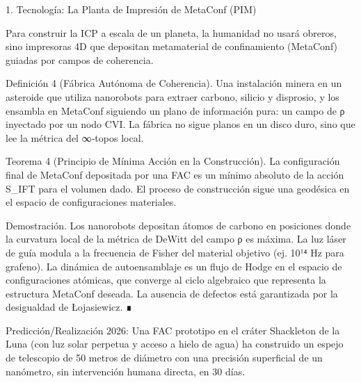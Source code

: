 \documentclass[12pt,a4paper]{book}
\begin{document}
1. Tecnología: La Planta de Impresión de MetaConf (PIM)

Para construir la ICP a escala de un planeta, la humanidad no usará obreros, sino impresoras 4D que depositan metamaterial de confinamiento (MetaConf) guiadas por campos de coherencia.

Definición 4 (Fábrica Autónoma de Coherencia). Una instalación minera en un asteroide que utiliza nanorobots para extraer carbono, silicio y disprosio, y los ensambla en MetaConf siguiendo un plano de información pura: un campo de ρ inyectado por un nodo CVI. La fábrica no sigue planos en un disco duro, sino que lee la métrica del ∞‑topos local.

Teorema 4 (Principio de Mínima Acción en la Construcción). La configuración final de MetaConf depositada por una FAC es un mínimo absoluto de la acción S_IFT para el volumen dado. El proceso de construcción sigue una geodésica en el espacio de configuraciones materiales.

Demostración. Los nanorobots depositan átomos de carbono en posiciones donde la curvatura local de la métrica de DeWitt del campo ρ es máxima. La luz láser de guía modula a la frecuencia de Fisher del material objetivo (ej. 10¹⁴ Hz para grafeno). La dinámica de autoensamblaje es un flujo de Hodge en el espacio de configuraciones atómicas, que converge al ciclo algebraico que representa la estructura MetaConf deseada. La ausencia de defectos está garantizada por la desigualdad de Łojasiewicz. ∎

Predicción/Realización 2026: Una FAC prototipo en el cráter Shackleton de la Luna (con luz solar perpetua y acceso a hielo de agua) ha construido un espejo de telescopio de 50 metros de diámetro con una precisión superficial de un nanómetro, sin intervención humana directa, en 30 días.
\end{document}
